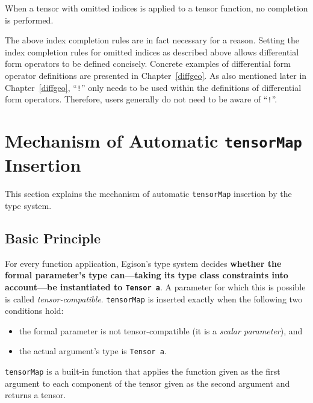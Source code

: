 When a tensor with omitted indices is applied to a tensor function, no completion is performed.

The above index completion rules are in fact necessary for a reason.
Setting the index completion rules for omitted indices as described above allows differential form operators to be defined concisely.
Concrete examples of differential form operator definitions are presented in Chapter~\ref{diffgeo}.
As also mentioned later in Chapter~\ref{diffgeo}, ``\verb|!|'' only needs to be used within the definitions of differential form operators.
Therefore, users generally do not need to be aware of ``\verb|!|''.

\section{Mechanism of Automatic \texttt{tensorMap} Insertion}\label{tensor-tensormap}

This section explains the mechanism of automatic \lstinline{tensorMap} insertion by the type system.

\subsection{Basic Principle}

For every function application, Egison's type system decides \textbf{whether the formal parameter's type can---taking its type class constraints into account---be instantiated to \lstinline{Tensor a}}.
A parameter for which this is possible is called \emph{tensor-compatible}.
\lstinline{tensorMap} is inserted exactly when the following two conditions hold:
\begin{itemize}
\item the formal parameter is not tensor-compatible (it is a \emph{scalar parameter}), and
\item the actual argument's type is \lstinline{Tensor a}.
\end{itemize}
\lstinline{tensorMap} is a built-in function that applies the function given as the first argument to each component of the tensor given as the second argument and returns a tensor.

